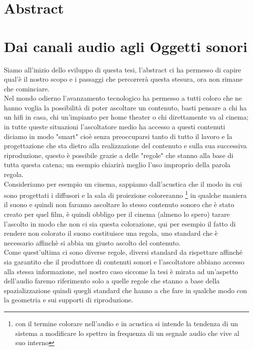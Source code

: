 \documentclass[12pt,a4paper]{report}
\begin{document}
\tableofcontents

\listoffigures



\chapter*{Abstract}





\chapter{Dai canali audio agli Oggetti sonori}

Siamo all'inizio dello sviluppo di questa tesi, l'abstract ci ha permesso di capire qual'è il nostro scopo e i passaggi che percorrerà questa stesura, ora non rimane che cominciare.\\

Nel mondo odierno l'avanzamento tecnologico ha permesso a tutti coloro che ne hanno voglia la possibilità di poter ascoltare un contenuto, basti pensare a chi ha un hifi in casa, chi un'impianto per home theater o chi direttamente va al cinema; in tutte queste situazioni l'ascoltatore medio ha accesso a questi contenuti diciamo in modo "smart" cioè senza preoccuparsi tanto di tutto il lavoro e la progettazione che sta dietro alla realizzazione del contenuto e sulla sua successiva riproduzione, questo è possibile grazie a delle "regole" che stanno alla base di tutta questa catena; un esempio chiarirà meglio l'uso improprio della parola regola.\\

Consideriamo per esempio un cinema, sappiamo dall'acustica che il modo in cui sono progettati i diffusori e la sala di proiezione coloreranno \footnote{con il termine colorare nell'audio e in acustica si intende la tendenza di un sistema a modificare lo spettro in frequenza di un segnale audio che vive al suo interno} in qualche maniera il suono e quindi non faranno ascoltare lo stesso contenuto sonoro che è stato creato per quel film, è quindi obbligo per il cinema (almeno lo spero) tarare l'ascolto in modo che non ci sia questa colorazione, qui per esempio il fatto   di rendere non colorato il suono costituisce una regola, uno standard che è necessario affinchè si abbia un giusto ascolto del contenuto.\\

Come quest'ultima ci sono diverse regole, diversi standard da rispettare affinché sia garantito che il produttore di contenuti sonori e l'ascoltatore abbiano accesso alla stessa informazione, nel nostro caso siccome la tesi è mirata ad un'aspetto dell'audio faremo riferimento solo a quelle regole che stanno a base della spazializzazione quindi quegli standard che hanno a che fare in qualche modo con la geometria e sui supporti di riproduzione.\\
\end{document}
